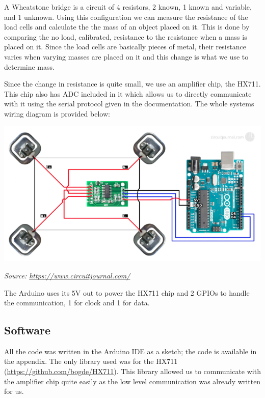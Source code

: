 \documentclass[10pt]{article}
\begin{document}
A Wheatstone bridge is a circuit of 4 resistors, 2 known, 1 known and variable, and 1 unknown. Using this configuration we can measure the resistance of the load cells and calculate the the mass of an object placed on it. This is done by comparing the no load, calibrated, resistance to the resistance when a mass is placed on it. Since the load cells are basically pieces of metal, their resistance varies when varying masses are placed on it and this change is what we use to determine mass.

Since the change in resistance is quite small, we use an amplifier chip, the HX711. This chip also has ADC included in it which allows us to directly communicate with it using the serial protocol given in the documentation. The whole systems wiring diagram is provided below:

{\center\includegraphics[scale=.3]{sytemwiring}\par}
{\textit{Source: \href{https://circuitjournal.com/50kg-load-cells-with-HX711}{https://www.circuitjournal.com/}}}

The Arduino uses its 5V out to power the HX711 chip and 2 GPIOs to handle the communication, 1 for clock and 1 for data.

\subsection{Software}
All the code was written in the Arduino IDE as a sketch; the code is available in the appendix. The only library used was for the HX711 (\href{https://github.com/bogde/HX711}{https://github.com/bogde/HX711}). This library allowed us to communicate with the amplifier chip quite easily as the low level communication was already written for us.
\end{document}
